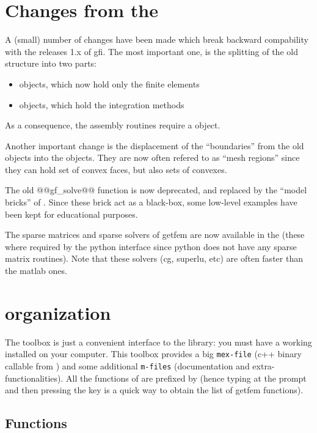 \section{Changes from the }

A (small) number of changes have been made which break backward compability with the releases 1.x of gfi. The most important one, is the splitting of the old \mf structure into two parts:
\begin{itemize}
\item \tmf objects, which now hold only the finite elements
\item \tmim objects, which hold the integration methods
\end{itemize}
As a consequence, the assembly routines require a \tmim object.


Another important change is the displacement of the ``boundaries'' from the old \mf objects into the \tmesh objects. They are now often refered to as ``mesh regions'' since they can hold set of convex faces, but also sets of convexes. 


The old @@gf\_solve@@ function is now deprecated, and replaced by the
``model bricks'' of \gf. Since these brick act as a black-box, some
low-level examples have been kept for educational purposes.


The sparse matrices and sparse solvers of getfem are now available in
the \gfi (these where required by the python interface since python
does not have any sparse matrix routines). Note that these solvers
(cg, superlu, etc) are often faster than the matlab ones.

\section{\Gfm organization}
The \gfm toolbox is just a convenient interface to the \gf library: you must
have a working \gf installed on your computer. This toolbox
provides a big \texttt{mex-file} (c++ binary callable from \mlab) and
some additional \texttt{m-files} (documentation and extra-functionalities).
All the functions of \Gfm are prefixed by  (hence typing
 at the \mlab prompt and then pressing the  key is
a quick way to obtain the list of getfem functions).

\subsection{Functions}

